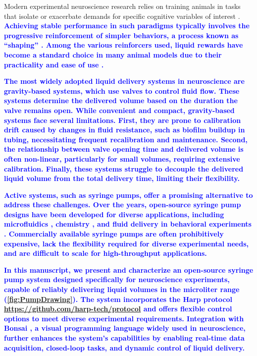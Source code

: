 Modern experimental neuroscience research relies on training animals in tasks that isolate or exacerbate demands for specific cognitive variables of interest \citep{Gomez-Marin2016}. \textcolor{blue}{\textbf{Achieving stable performance in such paradigms typically involves the progressive reinforcement of simpler behaviors, a process known as “shaping” \citep{Jones1939}. Among the various reinforcers used, liquid rewards have become a standard choice in many animal models due to their practicality and ease of use \citep{Guo2014}.}} 

\textcolor{blue}{\textbf{The most widely adopted liquid delivery systems in neuroscience are gravity-based systems, which use valves to control fluid flow. These systems determine the delivered volume based on the duration the valve remains open. While convenient and compact, gravity-based systems face several limitations. First, they are prone to calibration drift caused by changes in fluid resistance, such as biofilm buildup in tubing, necessitating frequent recalibration and maintenance. Second, the relationship between valve opening time and delivered volume is often non-linear, particularly for small volumes, requiring extensive calibration. Finally, these systems struggle to decouple the delivered liquid volume from the total delivery time, limiting their flexibility.}}

\textcolor{blue}{\textbf{Active systems, such as syringe pumps, offer a promising alternative to address these challenges. Over the years, open-source syringe pump designs have been developed for diverse applications, including microfluidics \citep{Lake2017,Booeshaghi2019,Park2024}, chemistry \citep{Cubberley2016,Garcia2018,Samokhin2020}, and fluid delivery in behavioral experiments \citep{Amarante2019}. Commercially available syringe pumps are often prohibitively expensive, lack the flexibility required for diverse experimental needs, and are difficult to scale for high-throughput applications.}}

\textcolor{blue}{\textbf{In this manuscript, we present and characterize an open-source syringe pump system designed specifically for neuroscience experiments, capable of reliably delivering  liquid volumes in the microliter range (\cref{fig:PumpDrawing}). The system incorporates the Harp protocol \url{https://github.com/harp-tech/protocol} and offers flexible control options to meet diverse experimental requirements. Integration with Bonsai \citep{Lopes2015}, a visual programming language widely used in neuroscience, further enhances the system's capabilities by enabling real-time data acquisition, closed-loop tasks, and dynamic control of liquid delivery.}}


